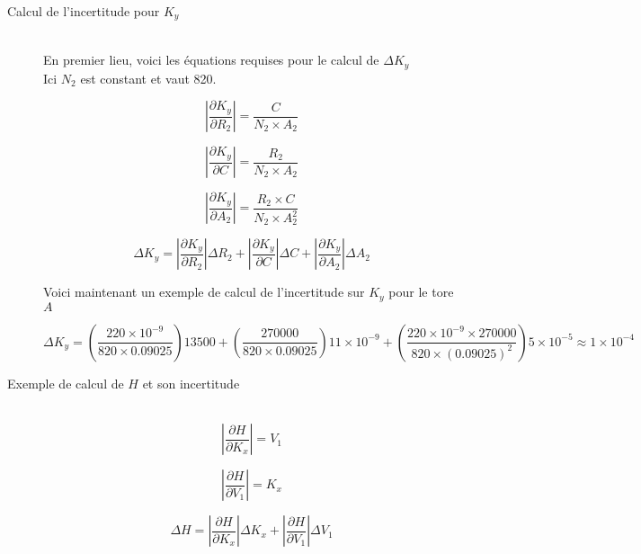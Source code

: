 \documentclass{article}
\begin{document}
\begin{description}
\item[Calcul de l'incertitude pour $K_y$] \hfill\\

En premier lieu, voici les équations requises pour le calcul de $\Delta K_y$\\
Ici $N_2$ est constant et vaut 820.

\begin{equation*}
\left| \frac{\partial K_y}{\partial R_2} \right| = \frac{C}{N_2\times A_2}
\end{equation*}

\begin{equation*}
\left| \frac{\partial K_y}{\partial C} \right| = \frac{R_2}{N_2\times A_2}
\end{equation*}

\begin{equation*}
\left| \frac{\partial K_y}{\partial A_2} \right| = \frac{R_2\times C}{N_2\times A_2^{2}}
\end{equation*}

\begin{equation*}
\Delta K_y = 
\left| \frac{\partial K_y}{\partial R_2} \right|\Delta R_2 +
\left| \frac{\partial K_y}{\partial C} \right|\Delta C + 
\left| \frac{\partial K_y}{\partial A_2} \right|\Delta A_2
\end{equation*}

Voici maintenant un exemple de calcul de l'incertitude sur $K_y$ pour le tore $A$

\begin{equation*}
\Delta K_y = \left(\frac{220\times 10^{-9}}{820\times 0.09025}\right)13500 +
\left(\frac{270000}{820\times 0.09025}\right)11\times 10^{-9} +
\left(\frac{220\times 10^{-9}\times 270000}{820\times (0.09025)^{2}}\right)5\times 10^{-5} \approx 1\times 10^{-4}
\end{equation*}

\item[Exemple de calcul de $H$ et son incertitude]\hfill\\


\begin{equation*}
\left| \frac{\partial H}{\partial K_x} \right| = V_1
\end{equation*}

\begin{equation*}
\left| \frac{\partial H}{\partial V_1} \right| = K_x
\end{equation*}

\begin{equation*}
\Delta H=
\left| \frac{\partial H}{\partial K_x} \right|\Delta K_x +
\left| \frac{\partial H}{\partial V_1} \right|\Delta V_1
\end{equation*}


\end{description}
\end{document}
